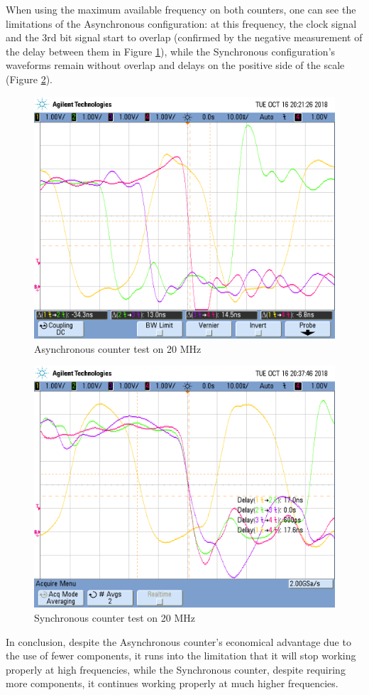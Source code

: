     When using the maximum available frequency on both counters, one can see the limitations of the Asynchronous 
    configuration: at this frequency, the clock signal and the 3rd bit signal start to overlap (confirmed by the 
    negative measurement of the delay between them in Figure \ref{fig:e7asynctest3}), while the Synchronous configuration's waveforms remain without
    overlap and delays on the positive side of the scale (Figure \ref{fig:e7synctest3}).

    \begin{figure}[h!]
        \begin{center}
            \includegraphics[width=0.6\linewidth]{../Exercise7/latex/images/e3_e7_async20mhz.png}
            \caption{\color{cyan}Asynchronous counter test on 20 MHz}
            \label{fig:e7asynctest3}
        \end{center}
    \end{figure}

\pagebreak
    \begin{figure}[h!]
        \begin{center}
            \includegraphics[width=0.6\linewidth]{../Exercise7/latex/images/e3_e7_sync_20mhz.png}
            \caption{\color{cyan}Synchronous counter test on 20 MHz}
            \label{fig:e7synctest3}
        \end{center}
    \end{figure}

    In conclusion, despite the Asynchronous counter's economical advantage due to the use of fewer components, it
    runs into the limitation that it will stop working properly at high frequencies, while the Synchronous counter,
    despite requiring more components, it continues working properly at much higher frequencies.
\pagebreak


%